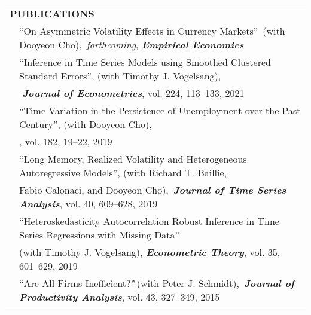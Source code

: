 \documentclass[10pt]{article}
\begin{document}
\begin{center}
\begin{tabular}{llllr}
\multicolumn{5}{l}{{\Large \textbf{P}}\textbf{UBLICATIONS}} \vspace{0.1cm}\\
& \multicolumn{4}{l}{\textquotedblleft On Asymmetric Volatility Effects in Currency Markets\textquotedblright \ (with Dooyeon Cho), \,\emph{forthcoming}, {\bf\emph{ Empirical Economics}}} \vspace{0.1cm}\\
& \multicolumn{4}{l}{\textquotedblleft Inference in Time Series Models using Smoothed Clustered Standard Errors\textquotedblright, (with Timothy J. Vogelsang),}\\
 & \multicolumn{4}{l}{{\bf \emph{ \,\,Journal of Econometrics}}, vol. 224, 113--133, 2021} \vspace{0.1cm}\\
& \multicolumn{4}{l}{\textquotedblleft Time Variation in the Persistence of Unemployment over the Past Century\textquotedblright, (with Dooyeon Cho),}\\
 & \multicolumn{4}{l}{\hspace{0.2cm}{\bf\emph{Economics Letters}}, vol. 182, 19--22, 2019}  \vspace{0.1cm}\\
& \multicolumn{4}{l}{\textquotedblleft  Long Memory, Realized Volatility and Heterogeneous Autoregressive Models\textquotedblright, (with Richard T. Baillie,}\\
& \multicolumn{4}{l}{\hspace{0.2cm} Fabio Calonaci, and Dooyeon Cho),\, \emph{{\bf\emph{Journal of Time Series Analysis}}}, vol. 40, 609--628, 2019} \vspace{0.1cm}\\
 & \multicolumn{4}{l}{\textquotedblleft Heteroskedasticity Autocorrelation Robust Inference in Time Series Regressions with Missing Data\textquotedblright \ } \\
& \multicolumn{4}{l}{\hspace{0.2cm}(with Timothy J. Vogelsang), \emph{{\bf\emph {Econometric Theory}}}, vol. 35, 601--629, 2019}  \vspace{0.1cm}\\
& \multicolumn{4}{l}{\textquotedblleft Are All Firms Inefficient?\textquotedblright \,(with Peter J. Schmidt),\, {\bf\emph{Journal of Productivity Analysis}}, vol. 43, 327--349, 2015 } \\
\multicolumn{5}{p{500pt}}{}\\

\end{tabular}
\end{center}
\end{document}
